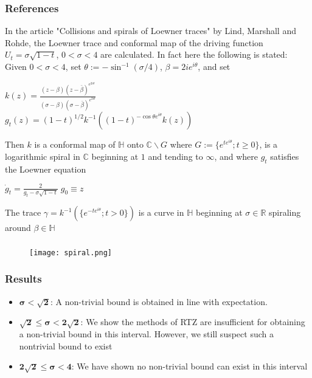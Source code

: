 \documentclass[10pt, compress]{beamer}
\begin{document}
\begin{frame}[fragile]
  \frametitle{References}
  \small
In the article "Collisions and spirals of Loewner traces" by Lind, Marshall and Rohde, the Loewner trace and conformal map of the driving function $U_{t} = \sigma\sqrt{1-t}$, $0 < \sigma < 4$ are calculated. In fact here the following is stated:\\

Given $0 < \sigma < 4$, set $\theta := -\sin^{-1}(\sigma/4)$, $\beta = 2ie^{i\theta}$, and set

\begin{center}
$k(z) = \frac{(z-\beta)(z-\bar{\beta})^{e^{2i\theta}}}{(\sigma - \beta)(\sigma - \bar{\beta})^{e^{2i\theta}}}$ \\
$g_{t}(z) = (1-t)^{1/2}k^{-1}((1-t)^{-\cos\theta e^{i\theta}}k(z))$
\end{center}

Then $k$ is a conformal map of $\mathbb{H}$ onto $\mathbb{C}\backslash G$ where $ G := \{e^{te^{i\theta}} ; t \geq 0 \}$, is a logarithmic spiral in $\mathbb{C}$ beginning at $1$ and tending to $\infty$, and where $g_{t}$ satisfies the Loewner equation
\begin{center}
$\displaystyle{\dot g_{t} = \frac{2}{g_{t} - \sigma\sqrt{1-t}} \; g_{0} \equiv z} $
\end{center}
The trace $\gamma = k^{-1}(\{e^{-te^{i\theta}} ; t > 0\})$ is a curve in $\mathbb{H}$ beginning at $\sigma \in \mathbb{R}$ spiraling around $\beta \in \mathbb{H}$

\normalsize
\end{frame}

\begin{frame}[fragile]
  \frametitle{}
\begin{figure}
 \texttt{[image: spiral.png]}
\end{figure}
\end{frame}

\begin{frame}[fragile]
  \frametitle{Results}
\begin{itemize}
\item $\boldsymbol{\sigma<\sqrt{2}}$: A non-trivial bound is obtained in line with expectation. \\

\item $\boldsymbol{\sqrt{2} \leq \sigma < 2\sqrt{2}}$: We show the methods of RTZ are insufficient for obtaining a non-trivial bound in this interval. However, we still suspect such a nontrivial bound to exist\\

\item $\boldsymbol{2\sqrt{2} \leq \sigma < 4}$: We have shown no non-trivial bound can exist in this interval
\end{itemize}
\end{frame}

\end{document}
